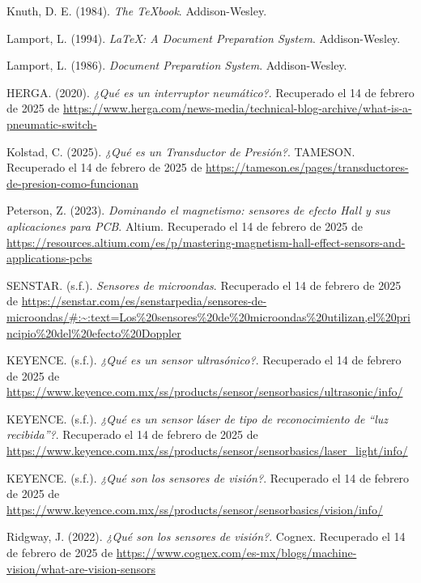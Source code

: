 \begin{thebibliography}{99}
	
	Knuth, D. E. (1984). 
	\textit{The TeXbook}. Addison-Wesley.
	
	Lamport, L. (1994). 
	\textit{LaTeX: A Document Preparation System}. Addison-Wesley.
	

	
	Lamport, L. (1986). 
	\textit{Document Preparation System}. Addison-Wesley.
	
	HERGA. (2020). 
	\textit{¿Qué es un interruptor neumático?}. Recuperado el 14 de febrero de 2025 de \url{https://www.herga.com/news-media/technical-blog-archive/what-is-a-pneumatic-switch-}
	
	Kolstad, C. (2025). 
	\textit{¿Qué es un Transductor de Presión?}. TAMESON. Recuperado el 14 de febrero de 2025 de \url{https://tameson.es/pages/transductores-de-presion-como-funcionan}
	
	Peterson, Z. (2023). 
	\textit{Dominando el magnetismo: sensores de efecto Hall y sus aplicaciones para PCB}. Altium. Recuperado el 14 de febrero de 2025 de \url{https://resources.altium.com/es/p/mastering-magnetism-hall-effect-sensors-and-applications-pcbs}
	
	SENSTAR. (s.f.). 
	\textit{Sensores de microondas}. Recuperado el 14 de febrero de 2025 de \url{https://senstar.com/es/senstarpedia/sensores-de-microondas/#:~:text=Los%20sensores%20de%20microondas%20utilizan,el%20principio%20del%20efecto%20Doppler}
	
	KEYENCE. (s.f.). 
	\textit{¿Qué es un sensor ultrasónico?}. Recuperado el 14 de febrero de 2025 de \url{https://www.keyence.com.mx/ss/products/sensor/sensorbasics/ultrasonic/info/}
	
	KEYENCE. (s.f.). 
	\textit{¿Qué es un sensor láser de tipo de reconocimiento de “luz recibida”?}. Recuperado el 14 de febrero de 2025 de \url{https://www.keyence.com.mx/ss/products/sensor/sensorbasics/laser_light/info/}
	
	KEYENCE. (s.f.). 
	\textit{¿Qué son los sensores de visión?}. Recuperado el 14 de febrero de 2025 de \url{https://www.keyence.com.mx/ss/products/sensor/sensorbasics/vision/info/}
	
	Ridgway, J. (2022). 
	\textit{¿Qué son los sensores de visión?}. Cognex. Recuperado el 14 de febrero de 2025 de \url{https://www.cognex.com/es-mx/blogs/machine-vision/what-are-vision-sensors}
	
	
\end{thebibliography}


